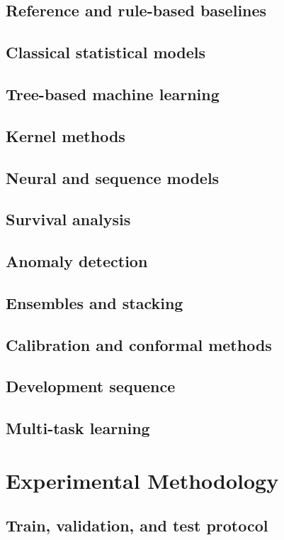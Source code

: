\documentclass[11pt,journal,onecolumn,draftclsnofoot]{IEEEtran}
\begin{document}
\subsection{Reference and rule-based baselines}
\subsection{Classical statistical models}
\subsection{Tree-based machine learning}
\subsection{Kernel methods}
\subsection{Neural and sequence models}
\subsection{Survival analysis}
\subsection{Anomaly detection}
\subsection{Ensembles and stacking}
\subsection{Calibration and conformal methods}
\subsection{Development sequence}
\subsection{Multi-task learning}

\section{Experimental Methodology}
\subsection{Train, validation, and test protocol}
\end{document}
